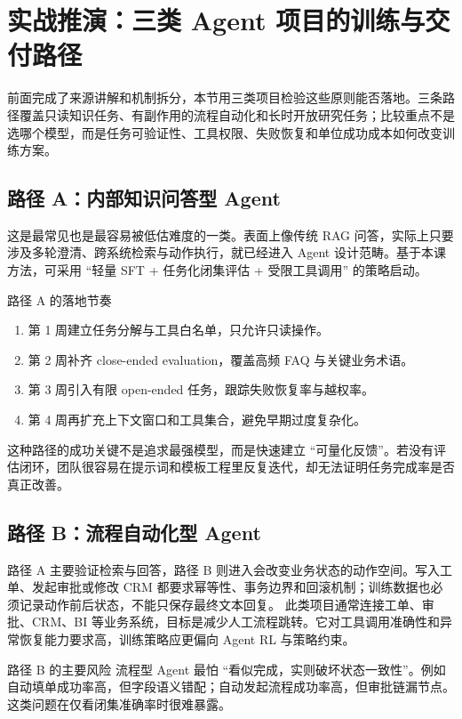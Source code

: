 \section{实战推演：三类 Agent 项目的训练与交付路径}

前面完成了来源讲解和机制拆分，本节用三类项目检验这些原则能否落地。三条路径覆盖只读知识任务、有副作用的流程自动化和长时开放研究任务；比较重点不是选哪个模型，而是任务可验证性、工具权限、失败恢复和单位成功成本如何改变训练方案。

\subsection{路径 A：内部知识问答型 Agent}
这是最常见也是最容易被低估难度的一类。表面上像传统 RAG 问答，实际上只要涉及多轮澄清、跨系统检索与动作执行，就已经进入 Agent 设计范畴。基于本课方法，可采用 ``轻量 SFT + 任务化闭集评估 + 受限工具调用'' 的策略启动。

\begin{knowledgebox}{路径 A 的落地节奏}
\begin{enumerate}
    \item 第 1 周建立任务分解与工具白名单，只允许只读操作。
    \item 第 2 周补齐 close-ended evaluation，覆盖高频 FAQ 与关键业务术语。
    \item 第 3 周引入有限 open-ended 任务，跟踪失败恢复率与越权率。
    \item 第 4 周再扩充上下文窗口和工具集合，避免早期过度复杂化。
\end{enumerate}
\end{knowledgebox}

这种路径的成功关键不是追求最强模型，而是快速建立 ``可量化反馈''。若没有评估闭环，团队很容易在提示词和模板工程里反复迭代，却无法证明任务完成率是否真正改善。

\subsection{路径 B：流程自动化型 Agent}
路径 A 主要验证检索与回答，路径 B 则进入会改变业务状态的动作空间。写入工单、发起审批或修改 CRM 都要求幂等性、事务边界和回滚机制；训练数据也必须记录动作前后状态，不能只保存最终文本回复。
此类项目通常连接工单、审批、CRM、BI 等业务系统，目标是减少人工流程跳转。它对工具调用准确性和异常恢复能力要求高，训练策略应更偏向 Agent RL 与策略约束。

\begin{importantbox}{路径 B 的主要风险}
流程型 Agent 最怕 ``看似完成，实则破坏状态一致性''。例如自动填单成功率高，但字段语义错配；自动发起流程成功率高，但审批链漏节点。这类问题在仅看闭集准确率时很难暴露。
\end{importantbox}

